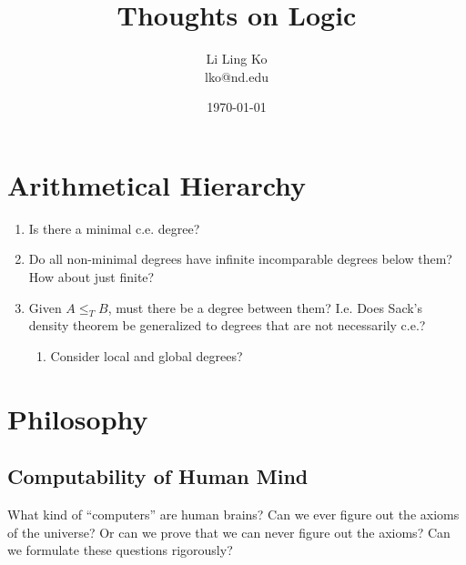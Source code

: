 \documentclass{article}
\begin{document}
\title{Thoughts on Logic}
\author{Li Ling Ko\\ lko@nd.edu}
\date{\today}
\maketitle

\section{Arithmetical Hierarchy}
  \begin{enumerate}
    \item Is there a minimal c.e. degree?

    \item Do all non-minimal degrees have infinite incomparable degrees
      below them? How about just finite?

    \item Given $A\leq_T B$, must there be a degree between them? I.e. Does
      Sack's density theorem be generalized to degrees that are not
      necessarily c.e.?

      \begin{enumerate}
        \item Consider local and global degrees?
      \end{enumerate}

  \end{enumerate}

\section{Philosophy}
  \subsection{Computability of Human Mind}
    What kind of ``computers'' are human brains? Can we ever figure out the
    axioms of the universe? Or can we prove that we can never figure out
    the axioms? Can we formulate these questions rigorously?
\end{document}
